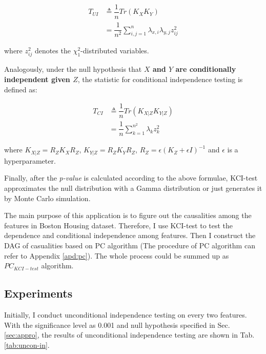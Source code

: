 \documentclass[12pt,a4paper]{article}
\theoremstyle{definition}
\begin{document}
\begin{large}
\begin{align*}
	T_{UI} & \triangleq \dfrac{1}{n}Tr(K_{X}K_{Y}) \\
	& = \dfrac{1}{n^2}\sum_{i,j=1}^{n}\lambda_{x,i}\lambda_{y,j}z^2_{ij}
\end{align*}
\end{large}
where $z^2_{ij}$ denotes the $\chi^2_1$-distributed variables.

\vspace{0.008\linewidth}
Analogously, under the null hypothesis that \textbf{$X$ and $Y$ are conditionally independent given $Z$}, the statistic for conditional independence testing is defined as:

\begin{large}
\begin{align*}
	T_{CI} & \triangleq \dfrac{1}{n}Tr(K_{X|Z}K_{Y|Z}) \\
	& = \dfrac{1}{n}\sum_{k=1}^{n^2}\lambda_{k}z^2_{k}
\end{align*}
\end{large}
where $K_{X|Z}=R_ZK_XR_Z$, $K_{Y|Z}=R_ZK_YR_Z$, $R_Z=\epsilon(K_Z+\epsilon I)^{-1}$ and $\epsilon$ is a hyperparameter.

\vspace{0.008\linewidth}
Finally, after the \textit{p-value} is calculated according to the above formulae, KCI-test approximates the null distribution with a Gamma distribution or just generates it by Monte Carlo simulation.

\vspace{0.008\linewidth}
The main purpose of this application is to figure out the causalities among the features in Boston Housing dataset. Therefore, I use KCI-test to test the dependence and conditional independence among features. Then I construct the DAG of casualities based on PC algorithm \cite{pc-alg} (The procedure of PC algorithm can refer to Appendix \ref{apd:pc}). The whole process could be summed up as $PC_{KCI-test}$ algorithm.

\subsection{Experiments}

Initially, I conduct unconditional independence testing on every two features. With the significance level as 0.001 and null hypothesis specified in Sec. \ref{sec:appro}, the results of unconditional independence testing are shown in Tab. \ref{tab:uncon-in}.
\end{document}
